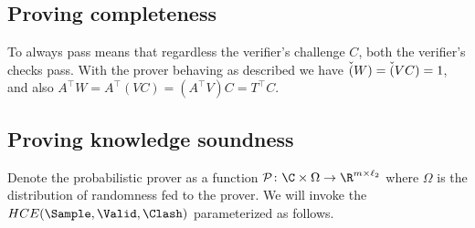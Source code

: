 \subsection{Proving completeness}

To always pass means that regardless the verifier's challenge $C$, both the verifier's checks pass.
With the prover behaving as described we have $\Check(W)=\Check(VC)=1$, and also $A^\intercal W=A^\intercal (VC)=(A^\intercal V)C=T^\intercal C$.


\subsection{Proving knowledge soundness}

Denote the probabilistic prover as a function $\mathcal{P}\colon\C\times\Omega\to\R^{m\times\ell_2}$ where $\Omega$ is the distribution of randomness fed to the prover.
We will invoke the  $HCE(\Sample,\Valid,\Clash)$ parameterized as follows.
